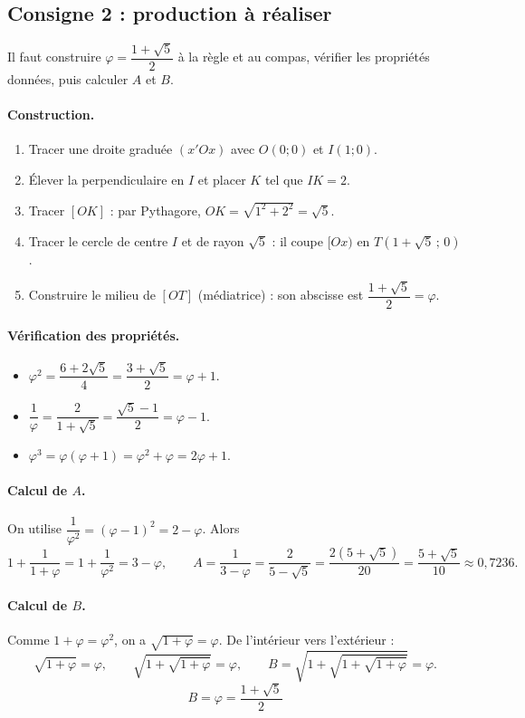 \documentclass[11pt,a4paper]{article}
\begin{document}
\subsection*{Consigne 2 : production \`a r\'ealiser}

Il faut construire $\varphi=\dfrac{1+\sqrt5}{2}$ \`a la r\`egle et au compas, v\'erifier les
propri\'et\'es donn\'ees, puis calculer $A$ et $B$.

\paragraph{Construction.}
\begin{enumerate}
  \item Tracer une droite gradu\'ee $(x'Ox)$ avec $O(0;0)$ et $I(1;0)$.
  \item \'Elever la perpendiculaire en $I$ et placer $K$ tel que $IK=2$.
  \item Tracer $[OK]$ : par Pythagore, $OK=\sqrt{1^2+2^2}=\sqrt5$.
  \item Tracer le cercle de centre $I$ et de rayon $\sqrt5$ : il coupe $[Ox)$ en $T(1+\sqrt5\,;\,0)$.
  \item Construire le milieu de $[OT]$ (m\'ediatrice) : son abscisse est $\dfrac{1+\sqrt5}{2}=\varphi$.
\end{enumerate}

\paragraph{V\'erification des propri\'et\'es.}
\begin{itemize}
  \item $\varphi^2=\dfrac{6+2\sqrt5}{4}=\dfrac{3+\sqrt5}{2}=\varphi+1$.
  \item $\dfrac1\varphi=\dfrac{2}{1+\sqrt5}=\dfrac{\sqrt5-1}{2}=\varphi-1$.
  \item $\varphi^3=\varphi(\varphi+1)=\varphi^2+\varphi=2\varphi+1$.
\end{itemize}

\paragraph{Calcul de $A$.} On utilise $\dfrac1{\varphi^2}=(\varphi-1)^2=2-\varphi$. Alors
\[
1+\frac{1}{1+\varphi}=1+\frac1{\varphi^2}=3-\varphi,
\qquad
A=\frac{1}{3-\varphi}=\frac{2}{5-\sqrt5}=\frac{2(5+\sqrt5)}{20}=\boxed{\frac{5+\sqrt5}{10}}\approx0{,}7236.
\]

\paragraph{Calcul de $B$.} Comme $1+\varphi=\varphi^2$, on a $\sqrt{1+\varphi}=\varphi$. De l'int\'erieur vers l'ext\'erieur :
\[
\sqrt{1+\varphi}=\varphi,\qquad \sqrt{1+\sqrt{1+\varphi}}=\varphi,\qquad B=\sqrt{1+\sqrt{1+\sqrt{1+\varphi}}}=\varphi.
\]
\[
\boxed{B=\varphi=\frac{1+\sqrt5}{2}}
\]
\end{document}
